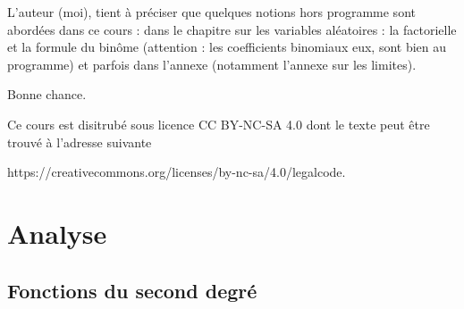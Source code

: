 L'auteur (moi), tient à préciser que quelques notions hors programme sont abordées dans ce cours : dans le chapitre sur les variables aléatoires : la factorielle et la formule du binôme (attention : les coefficients binomiaux eux, sont bien au programme) et parfois dans l'annexe (notamment l'annexe sur les limites).\newline

Bonne chance.


Ce cours est disitrubé sous licence CC BY-NC-SA 4.0 dont le texte peut être trouvé à l'adresse suivante
\begin{center}
   https://creativecommons.org/licenses/by-nc-sa/4.0/legalcode.
\end{center}
\part{Analyse}
\chapter{Fonctions du second degré}
